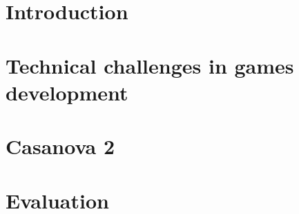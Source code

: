 \documentclass[runningheads,a4paper]{llncs}
\begin{document}
\section{Introduction}
\label{sec:introduction}



\section{Technical challenges in games development}
\label{sec:problem statement}



%

\section{Casanova 2}
\label{sec:casanova 2}



\section{Evaluation}
\label{sec:evaluation}







\end{document}

